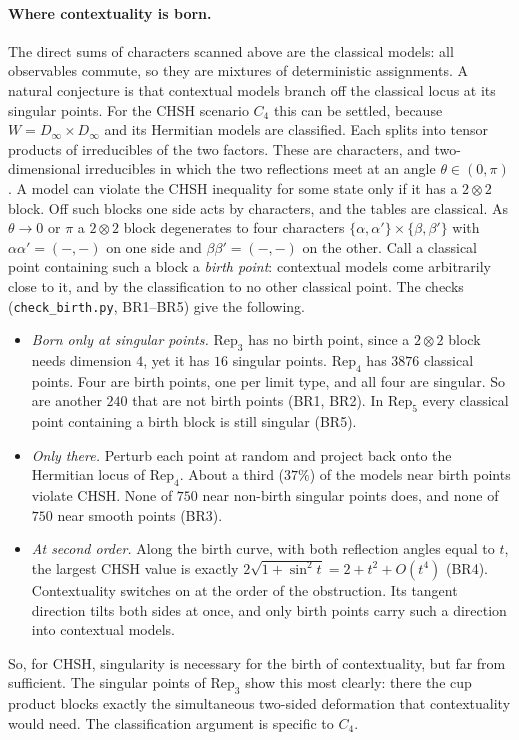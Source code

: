 \documentclass[11pt]{article}
\theoremstyle{definition}\newtheorem{definition}[theorem]{Definition}\newtheorem{remark}[theorem]{Remark}\newtheorem{example}[theorem]{Example}
\begin{document}
\paragraph{Where contextuality is born.}
The direct sums of characters scanned above are the classical models: all observables commute, so they are mixtures of deterministic
assignments. A natural conjecture is that contextual models branch off the classical locus at its singular points. For the CHSH scenario
$C_4$ this can be settled, because $W=D_\infty\times D_\infty$ and its Hermitian models are classified. Each splits into tensor products
of irreducibles of the two factors. These are characters, and two-dimensional irreducibles in which the two reflections meet at an angle
$\theta\in(0,\pi)$. A model can violate the CHSH inequality for some state only if it has a $2\otimes2$ block. Off such blocks one side
acts by characters, and the tables are classical. As $\theta\to0$ or $\pi$ a $2\otimes2$ block degenerates to four characters
$\{\alpha,\alpha'\}\times\{\beta,\beta'\}$ with $\alpha\alpha'=(-,-)$ on one side and $\beta\beta'=(-,-)$ on the other. Call a classical
point containing such a block a \emph{birth point}: contextual models come arbitrarily close to it, and by the classification to no other
classical point. The checks (\texttt{check\_birth.py}, BR1--BR5) give the following.
\begin{itemize}
\item \emph{Born only at singular points.} $\mathrm{Rep}_3$ has no birth point, since a $2\otimes2$ block needs dimension $4$, yet it has
  $16$ singular points. $\mathrm{Rep}_4$ has $3876$ classical points. Four are birth points, one per limit type, and all four are singular.
  So are another $240$ that are not birth points (BR1, BR2). In $\mathrm{Rep}_5$ every classical point containing a birth block is still
  singular (BR5).
\item \emph{Only there.} Perturb each point at random and project back onto the Hermitian locus of $\mathrm{Rep}_4$. About a third ($37\%$) of the
  models near birth points violate CHSH. None of $750$ near non-birth singular points does, and none of $750$ near smooth points (BR3).
\item \emph{At second order.} Along the birth curve, with both reflection angles equal to $t$, the largest CHSH value is exactly
  $2\sqrt{1+\sin^2t}=2+t^2+O(t^4)$ (BR4). Contextuality switches on at the order of the obstruction. Its tangent direction tilts both sides at
  once, and only birth points carry such a direction into contextual models.
\end{itemize}
So, for CHSH, singularity is necessary for the birth of contextuality, but far from sufficient. The singular points of $\mathrm{Rep}_3$ show this
most clearly: there the cup product blocks exactly the simultaneous two-sided deformation that contextuality would need. The classification
argument is specific to $C_4$.
\end{document}
